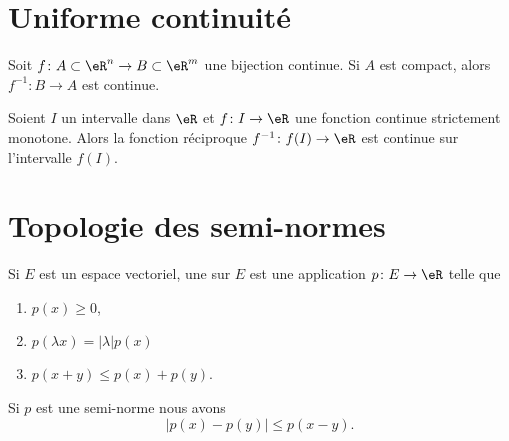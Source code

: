 					\section{Uniforme continuité}

\begin{proposition}	\label{PropoInvCompCont}
Soit $f\colon A\subset\eR^n\to B\subset\eR^m$ une bijection continue. Si $A$ est compact, alors $f^{-1}\colon B\to A$ est continue.
\end{proposition}

\begin{proposition}		\label{PropIntContMOnIvCont}
Soient $I$ un intervalle dans $\eR$ et $f\colon I\to \eR$ une fonction continue strictement monotone. Alors la fonction réciproque $f^{-1}\colon f(I)\to \eR$ est continue sur l'intervalle $f(I)$.
\end{proposition}

\section{Topologie des semi-normes}

\begin{definition}  \label{DefPNXlwmi}
    Si \( E\) est un espace vectoriel, une  sur \( E\) est une application \( p\colon E\to \eR\) telle que
    \begin{enumerate}
        \item
            \( p(x)\geq 0\),
        \item   \label{ItemSHnimhDii}
            \( p(\lambda x)=| \lambda |p(x)\)
        \item   \label{ItemSHnimhDiii}
            \( p(x+y)\leq p(x)+p(y)\).
    \end{enumerate}
\end{definition}

\begin{lemma}
    Si \( p\) est une semi-norme nous avons
    \begin{equation}
        | p(x)-p(y) |\leq p(x-y).
    \end{equation}
\end{lemma}

